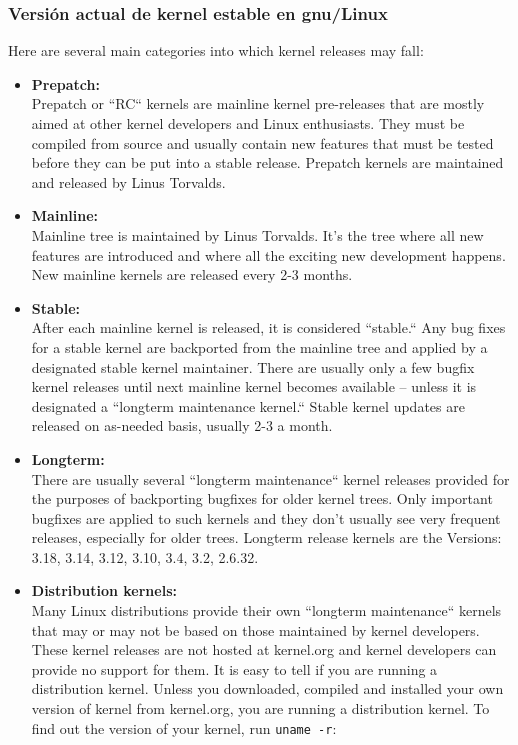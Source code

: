 \documentclass[a4paper,11pt,spanish]{article} %
\begin{document}
\cite{wikikernel}

\subsubsection{Versión actual de kernel estable en \ac{gnu}/Linux}

Here are several main categories into which kernel releases may fall:

\begin{itemize}
 \item \textbf{Prepatch: \\}
Prepatch or ``RC`` kernels are mainline kernel pre-releases that are mostly aimed at other kernel developers 
and Linux enthusiasts. They must be compiled from source and usually contain new features that must be 
tested before they can be put into a stable release. Prepatch kernels are maintained and released by 
Linus Torvalds.

\item \textbf{Mainline:\\}
Mainline tree is maintained by Linus Torvalds. It's the tree where all new features are introduced and 
where all the exciting new development happens. New mainline kernels are released every 2-3 months.

\item \textbf{Stable:\\}
After each mainline kernel is released, it is considered ``stable.`` Any bug fixes for a stable kernel 
are backported from the mainline tree and applied by a designated stable kernel maintainer. 
There are usually only a few bugfix kernel releases until next mainline kernel becomes available -- unless it is designated a ``longterm maintenance kernel.`` Stable kernel updates are released on as-needed basis, usually 2-3 a month.

\item \textbf{Longterm:\\}
There are usually several ``longterm maintenance`` kernel releases provided for the purposes of backporting 
bugfixes for older kernel trees. Only important bugfixes are applied to such kernels and they don't usually see very frequent releases, especially for older trees.
Longterm release kernels are the Versions: 3.18, 3.14, 3.12, 3.10, 3.4, 3.2, 2.6.32.

\item \textbf{Distribution kernels:\\}
Many Linux distributions provide their own ``longterm maintenance`` kernels that may or may not be based 
on those maintained by kernel developers. These kernel releases are not hosted at kernel.org and kernel
developers can provide no support for them.
It is easy to tell if you are running a distribution kernel. Unless you downloaded, compiled and installed
your own version of kernel from kernel.org, you are running a distribution kernel. 
To find out the version of your kernel, run \texttt{uname -r}:


\end{itemize}
\end{document}
